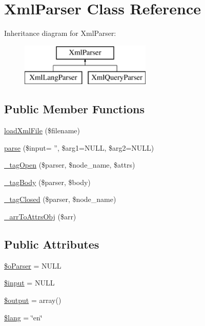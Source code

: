 \hypertarget{classXmlParser}{\section{Xml\+Parser Class Reference}
\label{classXmlParser}
}
Inheritance diagram for Xml\+Parser\+:\begin{figure}[H]
\begin{center}
\leavevmode
\includegraphics[height=2.000000cm]{classXmlParser}
\end{center}
\end{figure}
\subsection*{Public Member Functions}
\begin{DoxyCompactItemize}
\item 
\hyperlink{classXmlParser_a3975b17b893e196069963d433046771b}{load\+Xml\+File} (\$filename)
\item 
\hyperlink{classXmlParser_aa7b52a3ab42568f6f49056d928688e7a}{parse} (\$input= '', \$arg1=N\+U\+L\+L, \$arg2=N\+U\+L\+L)
\item 
\hyperlink{classXmlParser_a01facf5db302e49b0b61fb0e1b1fee36}{\+\_\+tag\+Open} (\$parser, \$node\+\_\+name, \$attrs)
\item 
\hyperlink{classXmlParser_a1205550b688631ab1296365904c61a92}{\+\_\+tag\+Body} (\$parser, \$body)
\item 
\hyperlink{classXmlParser_acb524a3ecf27535c9b085a93d714e1c5}{\+\_\+tag\+Closed} (\$parser, \$node\+\_\+name)
\item 
\hyperlink{classXmlParser_ad6c6c76f2e0c9fbd04c071fc30f1a193}{\+\_\+arr\+To\+Attrs\+Obj} (\$arr)
\end{DoxyCompactItemize}
\subsection*{Public Attributes}
\begin{DoxyCompactItemize}
\item 
\hyperlink{classXmlParser_aeee1082b5150f2adb53b16b42ca1b9f5}{\$o\+Parser} = N\+U\+L\+L
\item 
\hyperlink{classXmlParser_a65903457181cddd5d100685e0d6ba66a}{\$input} = N\+U\+L\+L
\item 
\hyperlink{classXmlParser_aa4324be74ded61847ce33730c7785389}{\$output} = array()
\item 
\hyperlink{classXmlParser_adbe603248522105c2912dcddeedcd6ab}{\$lang} = \char`\"{}en\char`\"{}
\end{DoxyCompactItemize}


